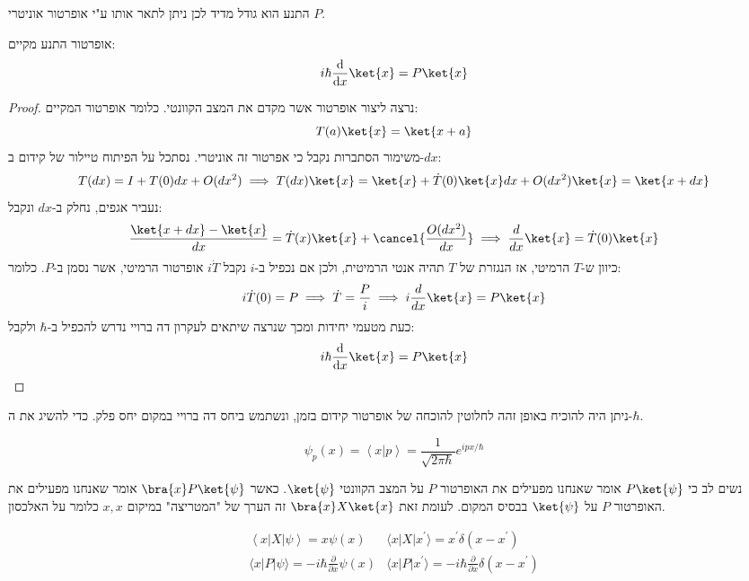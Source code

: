\documentclass{tstextbook}
\begin{document}
\begin{definition}
התנע הוא גודל מדיד לכן ניתן לתאר אותו ע"י אופרטור אוניטרי \(P\).

\end{definition}
\begin{proposition}
אופרטור התנע מקיים:
$$i\hbar \frac{\mathrm{d} }{\mathrm{d} x} \ket{x} = P\ket{x} $$

\end{proposition}
\begin{proof}
נרצה ליצור אופרטור אשר מקדם את המצב הקוונטי. כלומר אופרטור המקיים:
$$T(a)\ket{x} = \ket{x+a} $$
משימור הסתברות נקבל כי אפרטור זה אוניטרי. נסתכל על הפיתוח טיילור של קידום ב-\(dx\):
$$T(dx)=I+T(0)dx+O(dx^2)\implies T(dx)\ket{x} =\ket{x} +\dot{T}(0)\ket{x} dx+O(dx^2)\ket{x} =\ket{x+dx} $$
נעביר אגפים, נחלק ב-\(dx\) ונקבל:
$$\frac{\ket{x+dx}-\ket{x} }{dx}=\dot{T}(x)\ket{x} +\cancel{ \frac{O(dx^2)}{dx} }\implies  \frac{d}{dx}\ket{x} =\dot{T}(0)\ket{x}  $$
כיוון ש-\(T\) הרמיטי, אז הנגזרת של \(T\) תהיה אנטי הרמיטית, ולכן אם נכפיל ב-\(i\) נקבל \(i\dot{T}\) אופרטור הרמיטי, אשר נסמן ב-\(P\). כלומר:
$$i\dot{T}(0)=P\implies \dot{T}=\frac{P}{i }\implies i\frac{d}{dx}\ket{x}  =  P \ket{x}  $$
כעת מטעמי יחידות ומכך שנרצה שיתאים לעקרון דה ברויי נדרש להכפיל ב-\(\hbar\) ולקבל:
$$i\hbar \frac{\mathrm{d} }{\mathrm{d} x} \ket{x} = P\ket{x} $$

\end{proof}
\begin{remark}
ניתן היה להוכיח באופן זהה לחלוטין להוכחה של אופרטור קידום בזמן, ונשתמש ביחס דה ברויי במקום יחס פלק. כדי להשיג את ה-\(\hbar\).

\end{remark}
\begin{proposition}
$$\psi_{p}\left(x\right)=\left\langle x|p\right\rangle={\frac{1}{\sqrt{2\pi\hbar}}}e^{i p x/\hbar}$$

\end{proposition}
\begin{symbolize}
נשים לב כי \(P\ket{\psi}\) אומר שאנחנו מפעילים את האופרטור \(P\) על המצב הקוונטי \(\ket{\psi}\). כאשר \(\bra{x}P\ket{\psi}\) אומר שאנחנו מפעילים את האופרטור \(P\) על \(\ket{\psi}\) בבסיס המקום. לעומת זאת \(\bra{x}X\ket{x}\) זה הערך של "המטריצה" במיקום \(x,x\) כלומר על האלכסון.

\end{symbolize}
\begin{proposition}
\begin{gather*}\left\langle  x|X|\psi \right\rangle=x\psi(x)  & \langle x|X|x^{\prime}\rangle=x^{\prime}\delta(x-x^{\prime}) \\\langle x|P|\psi\rangle=-i\hbar\frac{\partial}{\partial x}\psi(x) & \langle x|P|x^{\prime}\rangle=-i\hbar{\frac{\partial}{\partial x}}\delta(x-x^{\prime})
\end{gather*}

\end{proposition}
\end{document}
